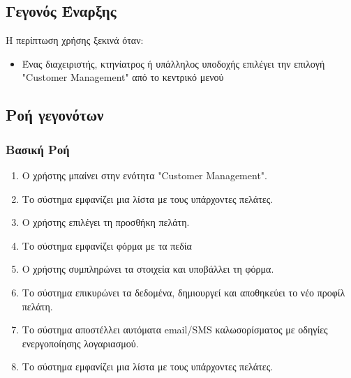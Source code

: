 \documentclass[12pt,a4paper,twoside]{book}
\begin{document}
\subsection{Γεγονός Έναρξης}
Η περίπτωση χρήσης ξεκινά όταν:
\begin{itemize}
  \item Ένας διαχειριστής, κτηνίατρος ή υπάλληλος υποδοχής επιλέγει την επιλογή "Customer Management" από το κεντρικό μενού %
\end{itemize}

\subsection{Ροή γεγονότων}

\subsubsection{Βασική Ροή}
\begin{enumerate}
  \item Ο χρήστης μπαίνει στην ενότητα "Customer Management". %
  \item Το σύστημα εμφανίζει μια λίστα με τους υπάρχοντες πελάτες.
  \item Ο χρήστης επιλέγει τη προσθήκη πελάτη.
  \item Το σύστημα εμφανίζει φόρμα με τα πεδία %
  \item Ο χρήστης συμπληρώνει τα στοιχεία και υποβάλλει τη φόρμα.
  \item Το σύστημα επικυρώνει τα δεδομένα, δημιουργεί και αποθηκεύει το νέο προφίλ πελάτη. %
  \item Το σύστημα αποστέλλει αυτόματα email/SMS καλωσορίσματος με οδηγίες ενεργοποίησης λογαριασμού. %
  \item Το σύστημα εμφανίζει μια λίστα με τους υπάρχοντες πελάτες.
\end{enumerate}
\end{document}
